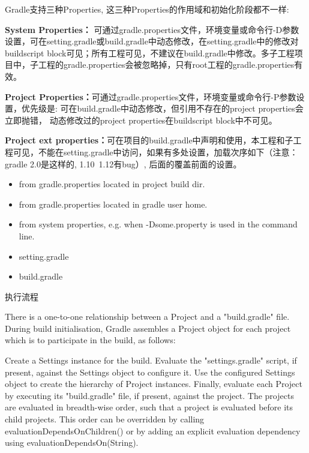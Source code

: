 \documentclass[12pt]{book}
\makeatletter
\numberwithin{dummy}{section}
\theoremstyle{ocrenumbox}
\theoremstyle{blacknumex}
\theoremstyle{blacknumbox}
\theoremstyle{ocrenum}
\renewcommand{\subsection}{\@startsection {subsection}{2}{\z@}
	{-3ex \@plus -0.1ex \@minus -.4ex}
	{0.5ex \@plus.2ex }
	{\normalfont\sffamily\bfseries}}
\makeatother
\begin{document}
Gradle支持三种Properties, 这三种Properties的作用域和初始化阶段都不一样:

\textbf{System Properties：}
可通过gradle.properties文件，环境变量或命令行-D参数设置，可在setting.gradle或build.gradle中动态修改，在setting.gradle中的修改对buildscript block可见；所有工程可见，不建议在build.gradle中修改。多子工程项目中，子工程的gradle.properties会被忽略掉，只有root工程的gradle.properties有效。

\textbf{Project Properties：}可通过gradle.properties文件，环境变量或命令行-P参数设置，优先级是:
可在build.gradle中动态修改，但引用不存在的project properties会立即抛错，
动态修改过的project properties在buildscript block中不可见。

\textbf{Project ext properties：}可在项目的build.gradle中声明和使用，本工程和子工程可见，不能在setting.gradle中访问，如果有多处设置，加载次序如下（注意：gradle 2.0是这样的, 1.10~1.12有bug）, 后面的覆盖前面的设置。

\begin{itemize}
	\item {from gradle.properties located in project build dir.}
	\item {from gradle.properties located in gradle user home.}
	\item {from system properties, e.g. when -Dsome.property is used in the command line.}
	\item {setting.gradle}
	\item {build.gradle}
\end{itemize}


\subsection{执行流程}

There is a one-to-one relationship between a Project and a "build.gradle" file. During build initialisation, Gradle assembles a Project object for each project which is to participate in the build, as follows:

Create a Settings instance for the build.
Evaluate the "settings.gradle" script, if present, against the Settings object to configure it.
Use the configured Settings object to create the hierarchy of Project instances.
Finally, evaluate each Project by executing its "build.gradle" file, if present, against the project. The projects are evaluated in breadth-wise order, such that a project is evaluated before its child projects. This order can be overridden by calling evaluationDependsOnChildren() or by adding an explicit evaluation dependency using evaluationDependsOn(String).
\end{document}
